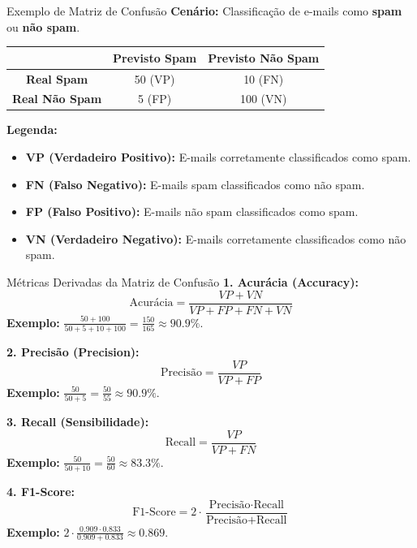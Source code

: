 \documentclass{beamer}
\begin{document}
\begin{frame}{Exemplo de Matriz de Confusão}
    \textbf{Cenário:} Classificação de e-mails como \textbf{spam} ou \textbf{não spam}.

    \begin{table}[]
        \begin{tabular}{|c|c|c|}
            \hline
            & \textbf{Previsto Spam} & \textbf{Previsto Não Spam} \\ \hline
            \textbf{Real Spam} & 50 (VP) & 10 (FN) \\ \hline
            \textbf{Real Não Spam} & 5 (FP) & 100 (VN) \\ \hline
        \end{tabular}
    \end{table}

    \textbf{Legenda:}
    \begin{itemize}
        \item \textbf{VP (Verdadeiro Positivo):} E-mails corretamente classificados como spam.
        \item \textbf{FN (Falso Negativo):} E-mails spam classificados como não spam.
        \item \textbf{FP (Falso Positivo):} E-mails não spam classificados como spam.
        \item \textbf{VN (Verdadeiro Negativo):} E-mails corretamente classificados como não spam.
    \end{itemize}
\end{frame}

\begin{frame}{Métricas Derivadas da Matriz de Confusão}
\footnotesize
    \textbf{1. Acurácia (Accuracy):}
    \[
    \text{Acurácia} = \frac{VP + VN}{VP + FP + FN + VN}
    \]
    \textbf{Exemplo:} \(\frac{50 + 100}{50 + 5 + 10 + 100} = \frac{150}{165} \approx 90.9\%\).

    \textbf{2. Precisão (Precision):}
    \[
    \text{Precisão} = \frac{VP}{VP + FP}
    \]
    \textbf{Exemplo:} \(\frac{50}{50 + 5} = \frac{50}{55} \approx 90.9\%\).

    \textbf{3. Recall (Sensibilidade):}
    \[
    \text{Recall} = \frac{VP}{VP + FN}
    \]
    \textbf{Exemplo:} \(\frac{50}{50 + 10} = \frac{50}{60} \approx 83.3\%\).

    \textbf{4. F1-Score:}
    \[
    \text{F1-Score} = 2 \cdot \frac{\text{Precisão} \cdot \text{Recall}}{\text{Precisão} + \text{Recall}}
    \]
    \textbf{Exemplo:} \(2 \cdot \frac{0.909 \cdot 0.833}{0.909 + 0.833} \approx 0.869\).
\end{frame}
\end{document}
